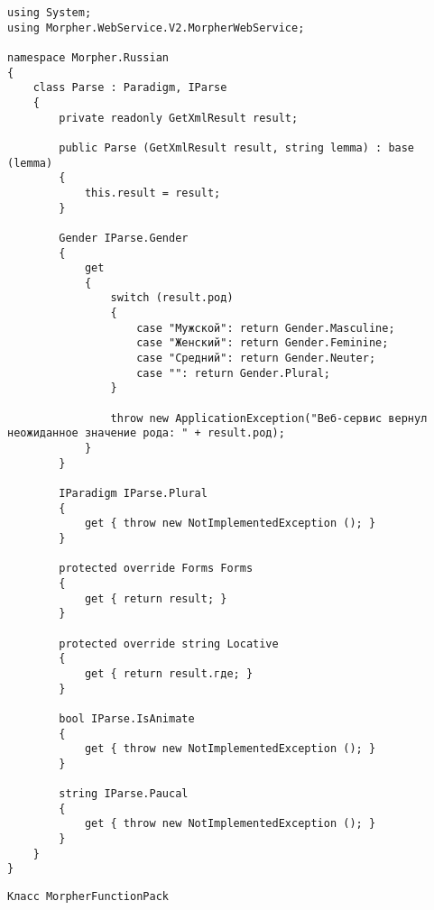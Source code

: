 \begin{lstlisting}
using System;
using Morpher.WebService.V2.MorpherWebService;

namespace Morpher.Russian
{
    class Parse : Paradigm, IParse
    {
        private readonly GetXmlResult result;

        public Parse (GetXmlResult result, string lemma) : base (lemma)
        {
            this.result = result;
        }

        Gender IParse.Gender
        {
            get 
            {
                switch (result.род)
                {
                    case "Мужской": return Gender.Masculine;      
                    case "Женский": return Gender.Feminine;      
                    case "Средний": return Gender.Neuter;      
                    case "": return Gender.Plural;      
                } 

                throw new ApplicationException("Веб-сервис вернул неожиданное значение рода: " + result.род);
            }
        }

        IParadigm IParse.Plural
        {
            get { throw new NotImplementedException (); }
        }

        protected override Forms Forms
        {
            get { return result; }
        }

        protected override string Locative
        {
            get { return result.где; }
        }

        bool IParse.IsAnimate
        {
            get { throw new NotImplementedException (); }
        }

        string IParse.Paucal
        {
            get { throw new NotImplementedException (); }
        }
    }
}
\end{lstlisting}

\begin{verbatim}
Класс MorpherFunctionPack
\end{verbatim}

